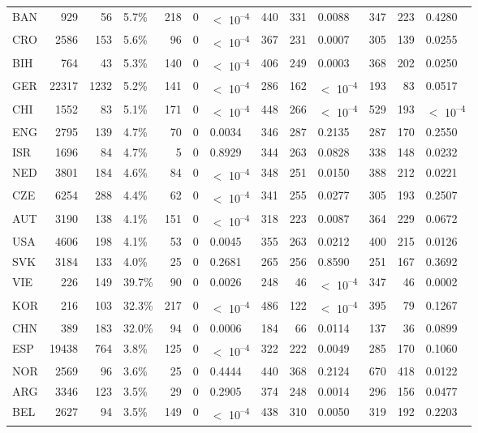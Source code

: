 \begin{tabular}[t]{lrrlrrlrrlrrl}
BAN & 929 & 56 & 5.7\% & 218 & 0 & $<$ 10\textsuperscript{--4} & 440 & 331 & 0.0088 & 347 & 223 & 0.4280\\
CRO & 2586 & 153 & 5.6\% & 96 & 0 & $<$ 10\textsuperscript{--4} & 367 & 231 & 0.0007 & 305 & 139 & 0.0255\\
BIH & 764 & 43 & 5.3\% & 140 & 0 & $<$ 10\textsuperscript{--4} & 406 & 249 & 0.0003 & 368 & 202 & 0.0250\\
GER & 22317 & 1232 & 5.2\% & 141 & 0 & $<$ 10\textsuperscript{--4} & 286 & 162 & $<$ 10\textsuperscript{--4} & 193 & 83 & 0.0517\\
CHI & 1552 & 83 & 5.1\% & 171 & 0 & $<$ 10\textsuperscript{--4} & 448 & 266 & $<$ 10\textsuperscript{--4} & 529 & 193 & $<$ 10\textsuperscript{--4}\\
ENG & 2795 & 139 & 4.7\% & 70 & 0 & 0.0034 & 346 & 287 & 0.2135 & 287 & 170 & 0.2550\\
ISR & 1696 & 84 & 4.7\% & 5 & 0 & 0.8929 & 344 & 263 & 0.0828 & 338 & 148 & 0.0232\\
NED & 3801 & 184 & 4.6\% & 84 & 0 & $<$ 10\textsuperscript{--4} & 348 & 251 & 0.0150 & 388 & 212 & 0.0221\\
CZE & 6254 & 288 & 4.4\% & 62 & 0 & $<$ 10\textsuperscript{--4} & 341 & 255 & 0.0277 & 305 & 193 & 0.2507\\
AUT & 3190 & 138 & 4.1\% & 151 & 0 & $<$ 10\textsuperscript{--4} & 318 & 223 & 0.0087 & 364 & 229 & 0.0672\\
USA & 4606 & 198 & 4.1\% & 53 & 0 & 0.0045 & 355 & 263 & 0.0212 & 400 & 215 & 0.0126\\
SVK & 3184 & 133 & 4.0\% & 25 & 0 & 0.2681 & 265 & 256 & 0.8590 & 251 & 167 & 0.3692\\
VIE & 226 & 149 & 39.7\% & 90 & 0 & 0.0026 & 248 & 46 & $<$ 10\textsuperscript{--4} & 347 & 46 & 0.0002\\
KOR & 216 & 103 & 32.3\% & 217 & 0 & $<$ 10\textsuperscript{--4} & 486 & 122 & $<$ 10\textsuperscript{--4} & 395 & 79 & 0.1267\\
CHN & 389 & 183 & 32.0\% & 94 & 0 & 0.0006 & 184 & 66 & 0.0114 & 137 & 36 & 0.0899\\
ESP & 19438 & 764 & 3.8\% & 125 & 0 & $<$ 10\textsuperscript{--4} & 322 & 222 & 0.0049 & 285 & 170 & 0.1060\\
NOR & 2569 & 96 & 3.6\% & 25 & 0 & 0.4444 & 440 & 368 & 0.2124 & 670 & 418 & 0.0122\\
ARG & 3346 & 123 & 3.5\% & 29 & 0 & 0.2905 & 374 & 248 & 0.0014 & 296 & 156 & 0.0477\\
BEL & 2627 & 94 & 3.5\% & 149 & 0 & $<$ 10\textsuperscript{--4} & 438 & 310 & 0.0050 & 319 & 192 & 0.2203\\

\end{tabular}

